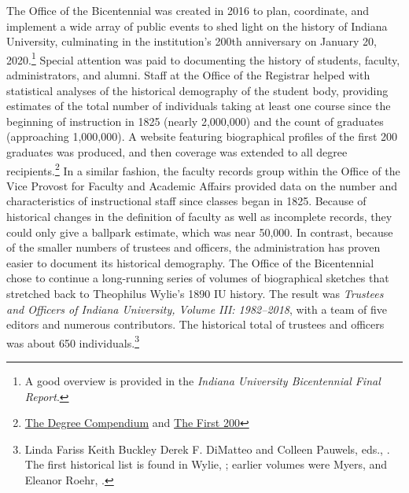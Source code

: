 \documentclass[
  american,
  letterpaper,
]{scrreprt}
\begin{document}
The Office of the Bicentennial was created in 2016 to plan, coordinate,
and implement a wide array of public events to shed light on the history
of Indiana University, culminating in the institution's 200th
anniversary on January 20, 2020.\footnote{A good overview is provided in
  the \emph{Indiana University Bicentennial Final Report}.} Special
attention was paid to documenting the history of students, faculty,
administrators, and alumni. Staff at the Office of the Registrar helped
with statistical analyses of the historical demography of the student
body, providing estimates of the total number of individuals taking at
least one course since the beginning of instruction in 1825 (nearly
2,000,000) and the count of graduates (approaching 1,000,000). A website
featuring biographical profiles of the first 200 graduates was produced,
and then coverage was extended to all degree recipients.\footnote{\href{https://allgrads.indiana.edu/}{The
  Degree Compendium} and \href{https://first200.iu.edu/}{The First 200}}
In a similar fashion, the faculty records group within the Office of the
Vice Provost for Faculty and Academic Affairs provided data on the
number and characteristics of instructional staff since classes began in
1825. Because of historical changes in the definition of faculty as well
as incomplete records, they could only give a ballpark estimate, which
was near 50,000. In contrast, because of the smaller numbers of trustees
and officers, the administration has proven easier to document its
historical demography. The Office of the Bicentennial chose to continue
a long-running series of volumes of biographical sketches that stretched
back to Theophilus Wylie's 1890 IU history. The result was
\emph{Trustees and Officers of Indiana University, Volume III:
1982--2018}, with a team of five editors and numerous contributors. The
historical total of trustees and officers was about 650
individuals.\footnote{Linda Fariss Keith Buckley Derek F. DiMatteo and
  Colleen Pauwels, eds., . The first historical list is found in
  Wylie, ; earlier volumes were Myers,
   and Eleanor Roehr,
  .}
\end{document}
